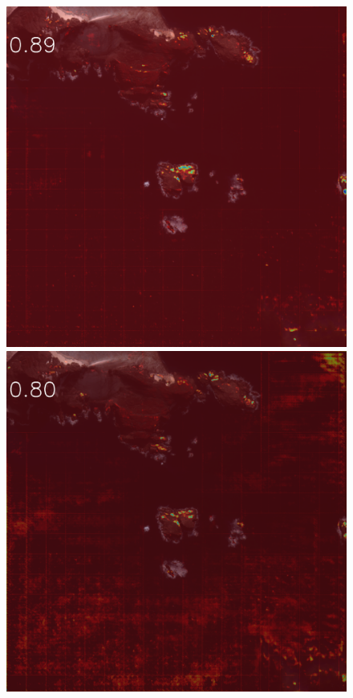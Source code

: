 \begin{figure}[h]
\includegraphics[width=\subFigx]{./fig/datagrow/MSE_single_unet_train_0_3.txt_bias-1_bs128_do0.1e25/orthoWV02_11FEB251253222-M1BS-1030010009092C00_u08rfAEAC.png}
\includegraphics[width=\subFigx]{./fig/datagrow/MSE_single_unet_train_0_4.txt_bias-1_bs128_do0.1e25/orthoWV02_11FEB251253222-M1BS-1030010009092C00_u08rfAEAC.png}



\end{figure}
